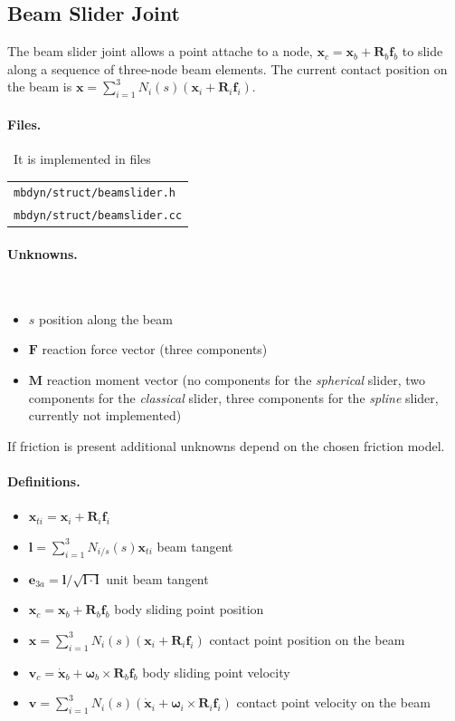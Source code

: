 \documentclass[10pt,fleqn,subeqn]{report}
\newcommand{\T}[1]{\bm{#1}}
\newcommand{\TT}[1]{\bm{#1}}
\begin{document}
\subsection{Beam Slider Joint}
\label{sec:BeamSliderJoint}
The beam slider joint allows a point attache to a node, 
$\T{x}_c = \T{x}_b+\TT{R}_b\T{f}_b$ to slide along a sequence of three-node beam
elements.
The current contact position on the beam is 
$\T{x}=\sum_{i=1}^3N_i(s)(\T{x}_i + \TT{R}_i\T{f}_i)$.

\paragraph{Files.} \
It is implemented in files

\begin{tabular}{l}
\texttt{mbdyn/struct/beamslider.h} \\
\texttt{mbdyn/struct/beamslider.cc}
\end{tabular}

\paragraph{Unknowns.} \
\begin{itemize}
\item $s$ position along the beam
\item $\T{F}$ reaction force vector (three components)
\item $\T{M}$ reaction moment vector (no components for the \emph{spherical} slider, two components for the
\emph{classical} slider, three components for the \emph{spline} slider, currently not implemented)
\end{itemize}
If friction is present additional unknowns depend on the chosen friction model.


\paragraph{Definitions.}
\begin{itemize}
\item $\T{x}_{ti} = \T{x}_i + \TT{R}_i\T{f}_i$ 
\item $\T{l} = \sum_{i=1}^3 N_{i/s}(s) \T{x}_{ti}$ beam tangent
\item $\T{e}_{3a} = \T{l} / \sqrt{\T{l}\cdot\T{l}}$ unit beam tangent
\item $\T{x}_c = \T{x}_b+\TT{R}_b\T{f}_b$ body sliding point position
\item $\T{x}=\sum_{i=1}^3N_i(s)(\T{x}_i + \TT{R}_i\T{f}_i)$ contact point position on the beam
\item $\T{v}_c = \dot{\T{x}}_b + \T{\omega}_b\times\TT{R}_b\T{f}_b$ body sliding point velocity
\item $\T{v}=\sum_{i=1}^3N_i(s)(\dot{\T{x}}_i + \T{\omega}_i\times\TT{R}_i\T{f}_i)$ contact point velocity on the beam
\end{itemize}
\end{document}
